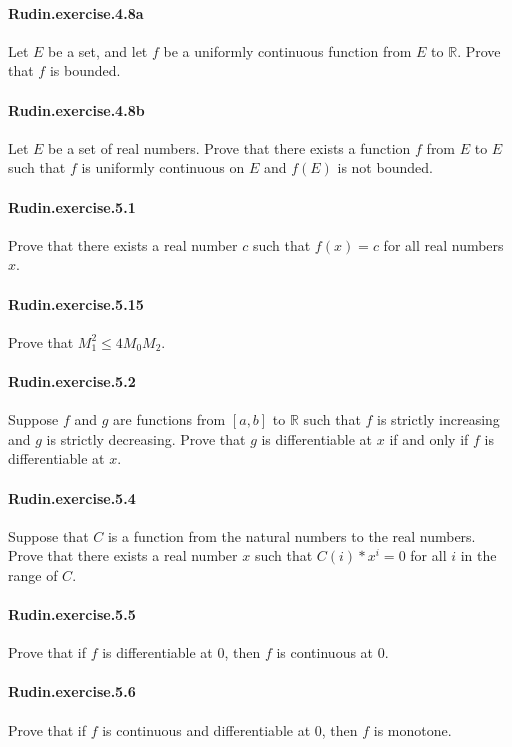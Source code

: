\documentclass{article}
\begin{document}
\paragraph{Rudin.exercise.4.8a} Let $E$ be a set, and let $f$ be a uniformly continuous function from $E$ to $\mathbb{R}$. Prove that $f$ is bounded.

\paragraph{Rudin.exercise.4.8b} Let $E$ be a set of real numbers. Prove that there exists a function $f$ from $E$ to $E$ such that $f$ is uniformly continuous on $E$ and $f(E)$ is not bounded.

\paragraph{Rudin.exercise.5.1} Prove that there exists a real number $c$ such that $f(x) = c$ for all real numbers $x$.

\paragraph{Rudin.exercise.5.15} Prove that $M_1^2 \leq 4M_0M_2$.

\paragraph{Rudin.exercise.5.2} Suppose $f$ and $g$ are functions from $[a,b]$ to $\mathbb{R}$ such that $f$ is strictly increasing and $g$ is strictly decreasing. Prove that $g$ is differentiable at $x$ if and only if $f$ is differentiable at $x$.

\paragraph{Rudin.exercise.5.4} Suppose that $C$ is a function from the natural numbers to the real numbers. Prove that there exists a real number $x$ such that $C(i) * x^i = 0$ for all $i$ in the range of $C$.

\paragraph{Rudin.exercise.5.5} Prove that if $f$ is differentiable at $0$, then $f$ is continuous at $0$.

\paragraph{Rudin.exercise.5.6} Prove that if $f$ is continuous and differentiable at $0$, then $f$ is monotone.
\end{document}
